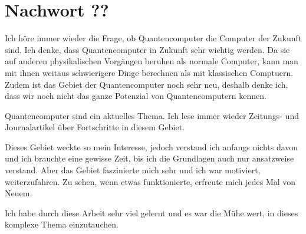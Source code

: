 \chapter{Nachwort ??}
Ich höre immer wieder die Frage, ob Quantencomputer die Computer der Zukunft sind. Ich denke, dass Quantencomputer in Zukunft sehr wichtig werden. Da sie auf anderen physikalischen Vorgängen beruhen als normale Computer, kann man mit ihnen weitaus schwierigere Dinge berechnen als mit klassischen Comptuern. Zudem ist das Gebiet der Quantencomputer noch sehr neu, deshalb denke ich, dass wir noch nicht das ganze Potenzial von Quantencomputern kennen.

Quantencomputer sind ein aktuelles Thema. Ich lese immer wieder Zeitungs- und Journalartikel über Fortschritte in diesem Gebiet.

Dieses Gebiet weckte so mein Interesse, jedoch verstand ich anfangs nichts davon und ich brauchte eine gewisse Zeit, bis ich die Grundlagen auch nur ansatzweise verstand. Aber das Gebiet faszinierte mich sehr und ich war motiviert, weiterzufahren. Zu sehen, wenn etwas funktionierte, erfreute mich jedes Mal von Neuem.

Ich habe durch diese Arbeit sehr viel gelernt und es war die Mühe wert, in dieses komplexe Thema einzutauchen. 